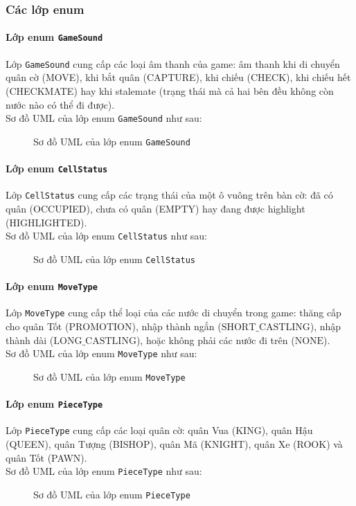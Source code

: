 \subsubsection{Các lớp enum}
\paragraph{Lớp enum \lstinline{GameSound}}
Lớp \lstinline{GameSound} cung cấp các loại âm thanh của game: âm thanh khi di chuyển quân cờ (MOVE), khi bắt quân (CAPTURE), khi chiếu (CHECK), khi chiếu hết (CHECKMATE) hay khi stalemate (trạng thái mà cả hai bên đều không còn nước nào có thể đi được).\\
Sơ đồ UML của lớp enum \lstinline{GameSound} như sau:
\begin{figure}[H]
\caption{Sơ đồ UML của lớp enum \lstinline{GameSound}}
\end{figure}
\paragraph{Lớp enum \lstinline{CellStatus}}
Lớp \lstinline{CellStatus} cung cấp các trạng thái của một ô vuông trên bàn cờ: đã có quân (OCCUPIED), chưa có quân (EMPTY) hay đang được highlight (HIGHLIGHTED).\\
Sơ đồ UML của lớp enum \lstinline{CellStatus} như sau:
\begin{figure}[H]
\caption{Sơ đồ UML của lớp enum \lstinline{CellStatus}}
\end{figure}
\paragraph{Lớp enum \lstinline{MoveType}}
Lớp \lstinline{MoveType} cung cấp thể loại của các nước di chuyển trong game: thăng cấp cho quân Tốt ($\mathrm{PROMOTION}$), nhập thành ngắn ($\mathrm{SHORT\_CASTLING}$), nhập thành dài ($\mathrm{LONG\_CASTLING}$), hoặc không phải các nước đi trên ($\mathrm{NONE}$).\\
Sơ đồ UML của lớp enum \lstinline{MoveType} như sau:
\begin{figure}[H]
\caption{Sơ đồ UML của lớp enum \lstinline{MoveType}}
\end{figure}
\paragraph{Lớp enum \lstinline{PieceType}}
Lớp \lstinline{PieceType} cung cấp các loại quân cờ: quân Vua (KING), quân Hậu (QUEEN), quân Tượng (BISHOP), quân Mã (KNIGHT), quân Xe (ROOK) và quân Tốt (PAWN).\\
Sơ đồ UML của lớp enum \lstinline{PieceType} như sau:
\begin{figure}[H]
\caption{Sơ đồ UML của lớp enum \lstinline{PieceType}}
\end{figure}
